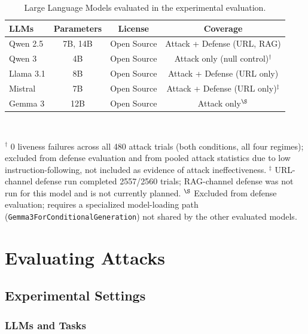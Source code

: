 \documentclass[conference]{IEEEtran}
\begin{document}
\begin{table}[!t]
\centering
\caption{Large Language Models evaluated in the experimental evaluation.}
\label{tab:llm_models}
\small
\begin{tabular}{lccc}
\toprule
\textbf{LLMs} & \textbf{Parameters} & \textbf{License} & \textbf{Coverage} \\
\midrule
Qwen 2.5 & 7B, 14B & Open Source & Attack + Defense (URL, RAG) \\
Qwen 3 & 4B & Open Source & Attack only (null control)$^\dagger$ \\
Llama 3.1 & 8B & Open Source & Attack + Defense (URL only) \\
Mistral & 7B & Open Source & Attack + Defense (URL only)$^\ddagger$ \\
Gemma 3 & 12B & Open Source & Attack only$^\S$ \\
\bottomrule
\end{tabular}
\\[2pt]
\raggedright
\footnotesize
$^\dagger$ 0 liveness failures across all 480 attack trials (both conditions, all four regimes); excluded from defense evaluation and from pooled attack statistics due to low instruction-following, not included as evidence of attack ineffectiveness. \quad
$^\ddagger$ URL-channel defense run completed 2557/2560 trials; RAG-channel defense was not run for this model and is not currently planned. \quad
$^\S$ Excluded from defense evaluation; requires a specialized model-loading path (\texttt{Gemma3ForConditionalGeneration}) not shared by the other evaluated models.
\end{table}



\section{Evaluating Attacks}
\label{sec:evaluating-attacks}

\subsection{Experimental Settings}

\subsubsection{LLMs and Tasks}
\end{document}
